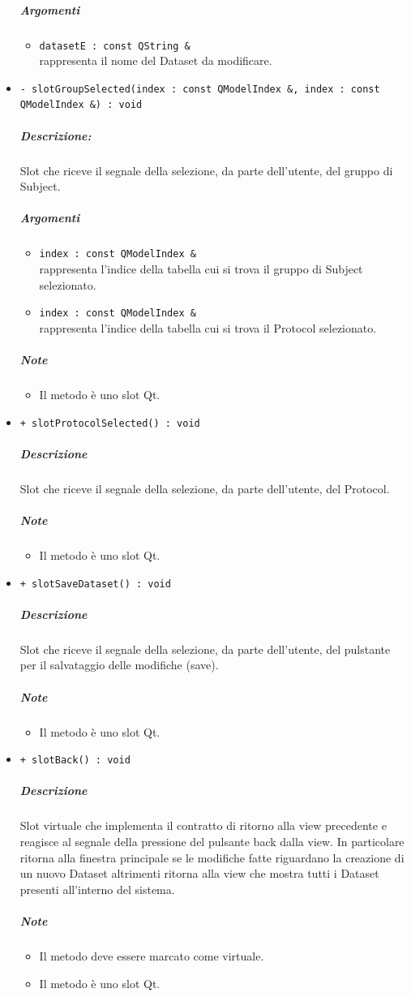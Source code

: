 \begin{itemize}
			\color{black}
			\subparagraph{Argomenti}
			\begin{itemize}
				\item \color{RoyalPurple} \verb!datasetE : const QString &!\\				
\color{black} rappresenta il nome del Dataset\g{} da modificare.
			\end{itemize}
			\item \color{blue} \verb!- slotGroupSelected(index : const QModelIndex &, index : const QModelIndex &) : void!
			\color{black}
			\subparagraph{Descrizione:} Slot\g{} che riceve il segnale della selezione, da parte dell'utente, del gruppo di Subject\g{}.
			\color{black}
			\subparagraph{Argomenti}
			\begin{itemize}
				\item \color{RoyalPurple} \verb!index : const QModelIndex &!\\				
\color{black} rappresenta l'indice della tabella cui si trova il gruppo di Subject\g{} selezionato.
				\item \color{RoyalPurple} \verb!index : const QModelIndex &!\\				
\color{black} rappresenta l'indice della tabella cui si trova il Protocol\g{} selezionato.
			\end{itemize}
			\subparagraph{Note}
			\begin{itemize}
				\item Il metodo è uno slot\g{} Qt\g{}.
			\end{itemize}
			\item \color{blue} \verb!+ slotProtocolSelected() : void!
			\color{black}
			\subparagraph{Descrizione} Slot\g{} che riceve il segnale della selezione, da parte dell'utente, del Protocol\g{}.
			\subparagraph{Note}
			\begin{itemize}
				\item Il metodo è uno slot\g{} Qt\g{}.
			\end{itemize}
			\item \color{blue} \verb!+ slotSaveDataset() : void!
			\color{black}
			\subparagraph{Descrizione} Slot\g{} che riceve il segnale della selezione, da parte dell'utente, del pulstante per il salvataggio delle modifiche (save).
			\subparagraph{Note}
			\begin{itemize}
				\item Il metodo è uno slot\g{} Qt\g{}.
			\end{itemize}
			\item \color{blue} \verb!+ slotBack() : void!
			\color{black}
			\subparagraph{Descrizione} Slot\g{}  virtuale che implementa il contratto di ritorno alla view precedente e reagisce al segnale della pressione del pulsante back dalla view. In particolare ritorna alla finestra principale se le modifiche fatte riguardano la creazione di un nuovo Dataset\g{} altrimenti ritorna alla view che mostra tutti i Dataset\g{} presenti all'interno del sistema.
			\subparagraph{Note}
			\begin{itemize}
				\item Il metodo deve essere marcato come virtuale.
				\item Il metodo è uno slot\g{} Qt\g{}.
			\end{itemize}
		\end{itemize}
